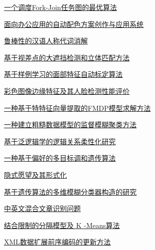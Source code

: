 \documentclass[a4paper]{article}
\begin{document}
\href{http://www.jos.org.cn/ch/reader/download_pdf.aspx?file_no=20050506&year_id=2005&quarter_id=5&falg=1}{一个调度Fork-Join任务图的最优算法}

\href{http://www.jos.org.cn/ch/reader/download_pdf.aspx?file_no=20050507&year_id=2005&quarter_id=5&falg=1}{面向办公应用的自动配色方案创作与应用系统}

\href{http://www.jos.org.cn/ch/reader/download_pdf.aspx?file_no=20050508&year_id=2005&quarter_id=5&falg=1}{鲁棒性的汉语人称代词消解}

\href{http://www.jos.org.cn/ch/reader/download_pdf.aspx?file_no=20050509&year_id=2005&quarter_id=5&falg=1}{基于视差点的大遮挡检测和立体匹配方法}

\href{http://www.jos.org.cn/ch/reader/download_pdf.aspx?file_no=20050510&year_id=2005&quarter_id=5&falg=1}{基于样例学习的面部特征自动标定算法}

\href{http://www.jos.org.cn/ch/reader/download_pdf.aspx?file_no=20050511&year_id=2005&quarter_id=5&falg=1}{彩色图像边缘特征及其人脸检测性能评价}

\href{http://www.jos.org.cn/ch/reader/download_pdf.aspx?file_no=20050512&year_id=2005&quarter_id=5&falg=1}{一种基于特特征向量提取的FMDP模型求解方法}

\href{http://www.jos.org.cn/ch/reader/download_pdf.aspx?file_no=20050513&year_id=2005&quarter_id=5&falg=1}{一种建立粗糙数据模型的监督模糊聚类方法}

\href{http://www.jos.org.cn/ch/reader/download_pdf.aspx?file_no=20050514&year_id=2005&quarter_id=5&falg=1}{基于泛逻辑学的逻辑关系柔性化研究}

\href{http://www.jos.org.cn/ch/reader/download_pdf.aspx?file_no=20050515&year_id=2005&quarter_id=5&falg=1}{一种基于偏好的多目标调和遗传算法}

\href{http://www.jos.org.cn/ch/reader/download_pdf.aspx?file_no=20050516&year_id=2005&quarter_id=5&falg=1}{隐式愿望及其形式化}

\href{http://www.jos.org.cn/ch/reader/download_pdf.aspx?file_no=20050517&year_id=2005&quarter_id=5&falg=1}{基于遗传算法的多维模糊分类器构造的研究}

\href{http://www.jos.org.cn/ch/reader/download_pdf.aspx?file_no=20050518&year_id=2005&quarter_id=5&falg=1}{中英文混合文章识别问题}

\href{http://www.jos.org.cn/ch/reader/download_pdf.aspx?file_no=20050519&year_id=2005&quarter_id=5&falg=1}{结合限制的分隔模型及 K -Means算法}

\href{http://www.jos.org.cn/ch/reader/download_pdf.aspx?file_no=20050520&year_id=2005&quarter_id=5&falg=1}{XML数据扩展前序编码的更新方法}
\end{document}
